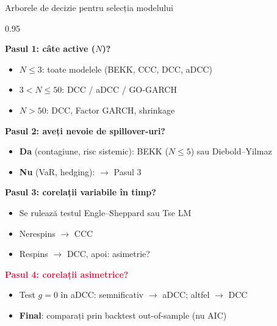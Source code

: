 \documentclass[9pt, aspectratio=169, t]{beamer}
\begin{document}
\begin{frame}{Arborele de decizie pentru selecția modelului}
    \begin{cminipage}{0.95\textwidth}
    \vspace{-3mm}
    {\scriptsize
    \textcolor{MainBlue}{\textbf{Pasul 1: câte active ($N$)?}}
    \begin{itemize}\setlength{\itemsep}{0pt}\setlength{\topsep}{0pt}
        \item $N \leq 3$: toate modelele (BEKK, CCC, DCC, aDCC)
        \item $3 < N \leq 50$: DCC / aDCC / GO-GARCH
        \item $N > 50$: DCC, Factor GARCH, shrinkage
    \end{itemize}
    \vspace{-1mm}
    \textcolor{MainBlue}{\textbf{Pasul 2: aveți nevoie de spillover-uri?}}
    \begin{itemize}\setlength{\itemsep}{0pt}\setlength{\topsep}{0pt}
        \item \textbf{Da} (contagiune, risc sistemic): BEKK ($N \leq 5$) sau Diebold--Yilmaz
        \item \textbf{Nu} (VaR, hedging): $\to$ Pasul 3
    \end{itemize}
    \vspace{-1mm}
    \textcolor{MainBlue}{\textbf{Pasul 3: corelații variabile în timp?}}
    \begin{itemize}\setlength{\itemsep}{0pt}\setlength{\topsep}{0pt}
        \item Se rulează testul Engle--Sheppard sau Tse LM
        \item Nerespins $\to$ CCC
        \item Respins $\to$ DCC, apoi: asimetrie?
    \end{itemize}
    \vspace{-1mm}
    \textcolor{Crimson}{\textbf{Pasul 4: corelații asimetrice?}}
    \begin{itemize}\setlength{\itemsep}{0pt}\setlength{\topsep}{0pt}
        \item Test $g = 0$ în aDCC: semnificativ $\to$ aDCC; altfel $\to$ DCC
        \item \textbf{Final}: comparați prin backtest out-of-sample (nu AIC)
    \end{itemize}
    }
    \end{cminipage}
\end{frame}
\end{document}
